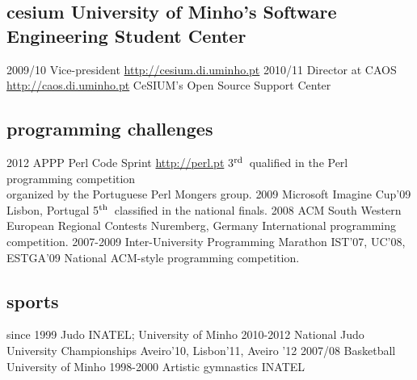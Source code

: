 \documentclass[a4paper]{friggeri-cv}
\begin{document}
\subsection{cesium {\normalfont\small University of Minho's Software Engineering Student Center}}{}
\begin{entrylist}
  \entry
    {2009/10}
    {Vice-president}
    {\href{http://cesium.di.uminho.pt}{http://cesium.di.uminho.pt}}
    {\vspace{-.8cm}}
  \entry
    {2010/11}
    {Director at CAOS}
    {\href{http://caos.di.uminho.pt}{http://caos.di.uminho.pt}}
    {CeSIUM's Open Source Support Center}
\end{entrylist}

\subsection{programming challenges}{}
\begin{entrylist}
  \entry
    {2012}
    {APPP Perl Code Sprint}
	{\href{http://perl.pt}{http://perl.pt}}
    {3$^{\footnotesize\textrm{rd}}$~qualified in the Perl programming competition\\organized by the Portuguese Perl Mongers group.}
  \entry
    {2009}
    {Microsoft Imagine Cup'09}
	{Lisbon, Portugal}
    {5$^{\footnotesize\textrm{th}}$~classified in the national finals.}
  \entry
    {2008}
    {ACM South Western European Regional Contests}
	{Nuremberg, Germany}
    {International programming competition.}
  \entry
    {2007-2009}
    {Inter-University Programming Marathon}
	{IST'07, UC'08, ESTGA'09}
    {National ACM-style programming competition.}
\end{entrylist}

\subsection{sports}{}
\begin{entrylist}
  \entry
    {{\footnotesize since} 1999}
    {Judo}
    {INATEL; University of Minho}
    {\vspace{-.8cm}}
  \entry
    {2010-2012}
    {National Judo University Championships}
    {Aveiro'10, Lisbon'11, Aveiro '12}
    {\vspace{-.8cm}}
  \entry
    {2007/08}
    {Basketball}
    {University of Minho}
    {\vspace{-.8cm}}
  \entry
    {1998-2000}
    {Artistic gymnastics}
    {INATEL}
    {}
\end{entrylist}
\end{document}
